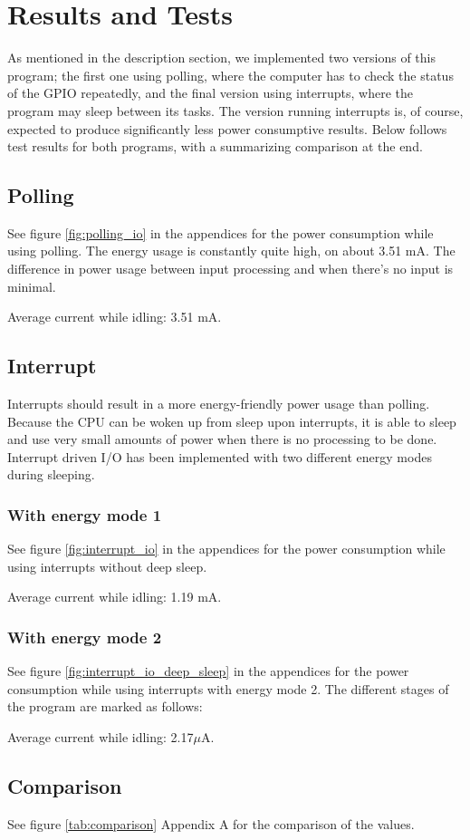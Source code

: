 \section{Results and Tests}

As mentioned in the description section, we implemented two versions of this program; the first one using polling, where the computer has to check the status of the GPIO repeatedly, and the final version using interrupts, where the program may sleep between its tasks. The version running interrupts is, of course, expected to produce significantly less power consumptive results. Below follows test results for both programs, with a summarizing comparison at the end.

\subsection{Polling}

See figure \ref{fig:polling_io} in the appendices for the power consumption while using polling. The energy usage is constantly quite high, on about 3.51 mA. The difference in power usage between input processing and when there's no input is minimal.

Average current while idling: 3.51 mA.

\subsection{Interrupt}

Interrupts should result in a more energy-friendly power usage than polling.
Because the CPU can be woken up from sleep upon interrupts, it is able to sleep and use very small amounts of power when there is no processing to be done. Interrupt driven I/O has been implemented with two different energy modes during sleeping.

\subsubsection{With energy mode 1}

See figure \ref{fig:interrupt_io} in the appendices for the power consumption while using interrupts without deep sleep.

Average current while idling: 1.19 mA.

\subsubsection{With energy mode 2}

See figure \ref{fig:interrupt_io_deep_sleep} in the appendices for the power consumption while using interrupts with energy mode 2. The different stages of the program are marked as follows:

Average current while idling: 2.17$\mu$A.

\subsection{Comparison}

See figure \ref{tab:comparison} Appendix A for the comparison of the values.
